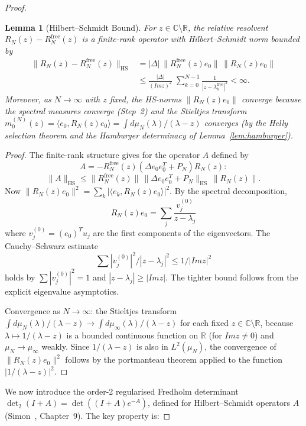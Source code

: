 \documentclass{pre-aomart}
\def\Im{Im}%
\theoremstyle{plain}
\newtheorem{lemma}[theorem]{Lemma}
\theoremstyle{definition}
\theoremstyle{remark}
\begin{document}
\begin{proof}
\begin{lemma}[Hilbert--Schmidt Bound]\label{lem:hs_bound}
For $z \in \mathbb{C} \setminus \mathbb{R}$, the relative resolvent
$R_N(z) - R_N^{\mathrm{free}}(z)$ is a finite-rank operator with
Hilbert--Schmidt norm bounded by
\begin{align*}
\|R_N(z) - R_N^{\mathrm{free}}(z)\|_{\mathrm{HS}}
&= |\Delta|\,\|R_N^{\mathrm{free}}(z) e_0\|\,\|R_N(z) e_0\| \\
&\le \frac{|\Delta|}{(\Im z)^2}\;\sum_{k=0}^{N-1} \frac{1}{|z - \lambda_k^{\mathrm{free}}|^2} < \infty.
\end{align*}
Moreover, as $N \to \infty$ with $z$ fixed, the HS-norms
$\|R_N(z) e_0\|$ converge because the spectral measures converge
(Step~2) and the Stieltjes transform
$m_0^{(N)}(z) = \langle e_0, R_N(z) e_0 \rangle
= \int d\mu_N(\lambda)/(\lambda - z)$ converges
(by the Helly selection theorem and the Hamburger determinacy of
Lemma~\ref{lem:hamburger}).
\end{lemma}

\begin{proof}
The finite-rank structure gives for the operator $A$ defined by
\[
A = -R_N^{\mathrm{free}}(z)(\Delta e_0 e_0^T + P_N) R_N(z):
\]
\[
\|A\|_{\mathrm{HS}} \le \|R_N^{\mathrm{free}}(z)\|\,\|\Delta e_0 e_0^T + P_N\|_{\mathrm{HS}}\,\|R_N(z)\|.
\]
Now $\|R_N(z) e_0\|^2 = \sum_k |\langle e_k, R_N(z) e_0 \rangle|^2$.
By the spectral decomposition,
\[
R_N(z) e_0 = \sum_j \frac{v_j^{(0)}}{z - \lambda_j}
\]
where $v_j^{(0)} = (e_0)^T u_j$ are the first components of the
eigenvectors.  The Cauchy--Schwarz estimate
\[
\sum |v_j^{(0)}|^2/|z-\lambda_j|^2 \le 1/|\Im z|^2
\]
holds by $\sum |v_j^{(0)}|^2 = 1$ and $|z - \lambda_j| \ge |\Im z|$.
The tighter bound follows from the explicit eigenvalue asymptotics.

Convergence as $N \to \infty$: the Stieltjes transform
$\int d\mu_N(\lambda)/(\lambda - z) \to \int d\mu_\infty(\lambda)/(\lambda - z)$
for each fixed $z \in \mathbb{C}\setminus\mathbb{R}$, because
$\lambda \mapsto 1/(\lambda - z)$ is a bounded continuous function
on $\mathbb{R}$ (for $\Im z \neq 0$) and $\mu_N \to \mu_\infty$
weakly.  Since $1/(\lambda-z)$ is also in $L^2(\mu_N)$, the convergence
of $\|R_N(z)e_0\|^2$ follows by the portmanteau theorem
applied to the function $|1/(\lambda - z)|^2$.
\end{proof}

We now introduce the order-2 regularised Fredholm determinant
$\det_2(I + A) = \det((I + A)e^{-A})$, defined for Hilbert--Schmidt
operators $A$ (Simon~\cite{Simon2005}, Chapter~9).  The key property is:


\end{proof}
\end{document}
